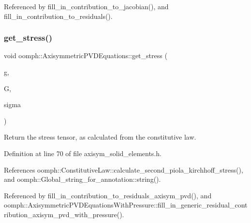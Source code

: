 Referenced by fill\+\_\+in\+\_\+contribution\+\_\+to\+\_\+jacobian(), and fill\+\_\+in\+\_\+contribution\+\_\+to\+\_\+residuals().

\mbox{\label{classoomph_1_1AxisymmetricPVDEquations_ad7984168072632f9d4f7218d81ca50eb}} 
\subsubsection{\texorpdfstring{get\+\_\+stress()}{get\_stress()}}
{\footnotesize\ttfamily void oomph\+::\+Axisymmetric\+P\+V\+D\+Equations\+::get\+\_\+stress (\begin{DoxyParamCaption}\item[{const \hyperlink{classoomph_1_1DenseMatrix}{Dense\+Matrix}$<$ double $>$ \&}]{g,  }\item[{const \hyperlink{classoomph_1_1DenseMatrix}{Dense\+Matrix}$<$ double $>$ \&}]{G,  }\item[{\hyperlink{classoomph_1_1DenseMatrix}{Dense\+Matrix}$<$ double $>$ \&}]{sigma }\end{DoxyParamCaption})\hspace{0.3cm}{\ttfamily [inline]}}



Return the stress tensor, as calculated from the constitutive law. 



Definition at line 70 of file axisym\+\_\+solid\+\_\+elements.\+h.



References oomph\+::\+Constitutive\+Law\+::calculate\+\_\+second\+\_\+piola\+\_\+kirchhoff\+\_\+stress(), and oomph\+::\+Global\+\_\+string\+\_\+for\+\_\+annotation\+::string().



Referenced by fill\+\_\+in\+\_\+contribution\+\_\+to\+\_\+residuals\+\_\+axisym\+\_\+pvd(), and oomph\+::\+Axisymmetric\+P\+V\+D\+Equations\+With\+Pressure\+::fill\+\_\+in\+\_\+generic\+\_\+residual\+\_\+contribution\+\_\+axisym\+\_\+pvd\+\_\+with\+\_\+pressure().

\mbox{\label{classoomph_1_1AxisymmetricPVDEquations_a70c01efa665238ec7a574588209d3edb}} 
